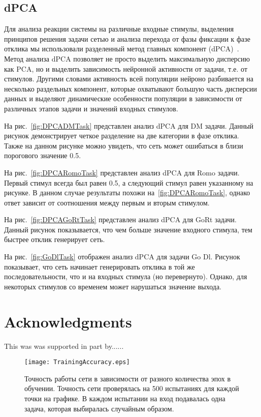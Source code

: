 \documentclass{article}
\begin{document}
\subsection{dPCA}
Для анализа реакции системы на различные входные стимулы, выделения принципов решения задачи сетью и анализа перехода от фазы фиксации к фазе отклика мы использовали разделенный метод главных компонент (dPCA)~\cite{kobak2014demixed}. Метод анализа dPCA позволяет не просто выделить максимальную дисперсию как PCA, но и выделить зависимость нейронной активности от задачи, т.е. от стимулов. Другими словами активность всей популяции нейроно разбивается на несколько раздельных компонент, которые охватывают большую часть дисперсии данных и выделяют динамические особенности популяции в зависимости от различных этапов задачи и значений входных стимулов.

На рис.~\ref{fig:DPCADMTask} представлен анализ dPCA для DM задачи. Данный рисунок демонстрирует четкое разделение на две категории в фазе отклика. Также на данном рисунке можно увидеть, что сеть может ошибаться в близи порогового значение 0.5.

На рис.~\ref{fig:DPCARomoTask} представлен анализ dPCA для Romo задачи. Первый стимул всегда был равен 0.5, а следующий стимул равен указанному на рисунке. В данном случае результаты похожи на~\ref{fig:DPCARomoTask}, однако ответ зависит от соотношения между первым и вторым стимулом.

На рис.~\ref{fig:DPCAGoRtTask} представлен анализ dPCA для GoRt задачи. Данный рисунок показывается, что чем больше значение входного стимула, тем быстрее отклик генерирует сеть.

На рис.~\ref{fig:GoDlTask} отображен анализ dPCA для задачи Go Dl. Рисунок показывает, что сеть начинает генерировать отклика в той же последовательности, что и на входных стимула (но перевернуто). Однако, для некоторых стимулов со временем может нарушаться значение выхода.

\section*{Acknowledgments}
This was was supported in part by......




\newpage
\begin{figure}[h!] \label{fig:TrainingAccuracy}
  \begin{center}
    \texttt{[image: TrainingAccuracy.eps]}
    \caption{Точность работы сети в зависимости от разного количества эпох в обучении. Точность сети проверялась на 500 испытаниях для каждой точки на графике. В каждом испытании на вход подавалась одна задача, которая выбиралась случайным образом.}
  \end{center}
\end{figure}
\end{document}
